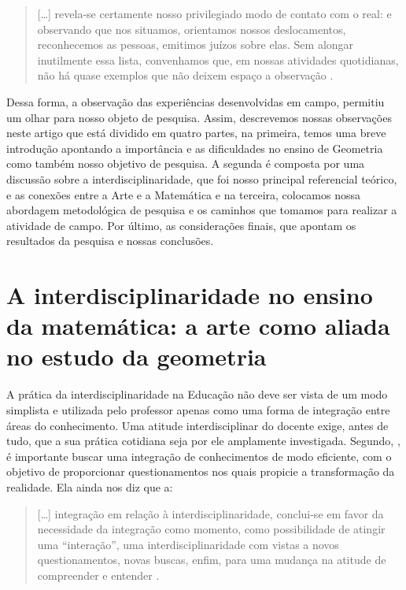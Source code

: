 \begin{refsection}
    \begin{quotation}
        [\dots] revela-se certamente nosso privilegiado modo de contato com o real: e observando que nos situamos, orientamos nossos deslocamentos, reconhecemos as pessoas, emitimos juízos sobre elas. Sem alongar inutilmente essa lista, convenhamos que, em nossas atividades quotidianas, não há quase exemplos que não deixem espaço a observação \textcite[p.~177]{LAVILLEAndDIONES1999Construção}. 
    \end{quotation}

    Dessa forma, a observação das experiências desenvolvidas em campo, permitiu um olhar para nosso objeto de pesquisa. Assim, descrevemos nossas observações neste artigo que está dividido em quatro partes, na primeira, temos uma breve introdução apontando a importância e as dificuldades no ensino de Geometria como também nosso objetivo de pesquisa. A segunda é composta por uma discussão sobre a interdisciplinaridade, que foi nosso principal referencial teórico, e as conexões entre a Arte e a Matemática e na terceira, colocamos nossa abordagem metodológica de pesquisa e os caminhos que tomamos para realizar a atividade de campo. Por último, as considerações finais, que apontam os resultados da pesquisa e nossas conclusões.

    \section{A interdisciplinaridade no ensino da matemática: a arte como aliada no estudo da geometria}

    A prática da interdisciplinaridade na Educação não deve ser vista de um modo simplista e utilizada pelo professor apenas como uma forma de integração entre áreas do conhecimento. Uma atitude interdisciplinar do docente exige, antes de tudo, que a sua prática cotidiana seja por ele amplamente investigada. Segundo, \cite{FAZENDA2011Integração}, é importante buscar uma integração de conhecimentos de modo eficiente, com o objetivo de proporcionar questionamentos nos quais propicie a transformação da realidade. Ela ainda nos diz que a: 

    \begin{quotation}
        [\dots] integração em relação à interdisciplinaridade, conclui-se em favor da necessidade da integração como momento, como possibilidade de atingir uma “interação”, uma interdisciplinaridade com vistas a novos questionamentos, novas buscas, enfim, para uma mudança na atitude de compreender e entender \cite[p.~84]{FAZENDA2011Integração}.
    \end{quotation}


\end{refsection}
